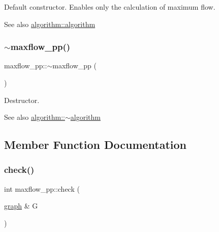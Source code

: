 Default constructor. Enables only the calculation of maximum flow.

\begin{DoxySeeAlso}{See also}
\mbox{\hyperlink{classalgorithm_ab79e1ddec2f2afdf4b36b10724db8b15}{algorithm\+::algorithm}} 
\end{DoxySeeAlso}
\mbox{\label{classmaxflow__pp_a2f96bfeea4cb2c044d155d356d72452a}} 
\subsubsection{\texorpdfstring{$\sim$maxflow\+\_\+pp()}{~maxflow\_pp()}}
{\footnotesize\ttfamily maxflow\+\_\+pp\+::$\sim$maxflow\+\_\+pp (\begin{DoxyParamCaption}{ }\end{DoxyParamCaption})\hspace{0.3cm}{\ttfamily [virtual]}}

Destructor.

\begin{DoxySeeAlso}{See also}
\mbox{\hyperlink{classalgorithm_adca9b1e7fa3afd914519a9dbb44e9fd5}{algorithm\+::$\sim$algorithm}} 
\end{DoxySeeAlso}


\subsection{Member Function Documentation}
\mbox{\label{classmaxflow__pp_a7ea24bd88999718e5e4e28ac028131cd}} 
\subsubsection{\texorpdfstring{check()}{check()}}
{\footnotesize\ttfamily int maxflow\+\_\+pp\+::check (\begin{DoxyParamCaption}\item[{\mbox{\hyperlink{classgraph}{graph}} \&}]{G }\end{DoxyParamCaption})\hspace{0.3cm}{\ttfamily [virtual]}}

